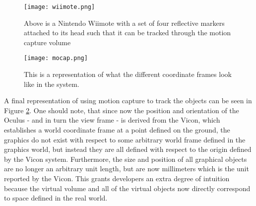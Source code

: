\begin{figure}[]
\centering
\texttt{[image: wiimote.png]}
\caption{Above is a Nintendo Wiimote with a set of four reflective markers
attached to its head such that it can be tracked through the motion capture
volume}
\label{fig:wiimote}
\end{figure}

\begin{figure}[]
\centering
\texttt{[image: mocap.png]}
\caption{This is a representation of what the different coordinate frames
look like in the system.}
\label{fig:mocap}
\end{figure}

A final representation of using motion capture to track the objects can be seen
in Figure \ref{fig:mocap}. One should note, that since now the position and
orientation of the Oculus - and in turn the view frame - is derived from the
Vicon, which establishes a world coordinate frame at a point defined on the
ground, the graphics do not exist with respect to some arbitrary world frame
defined in the graphics world, but instead they are all defined with respect to
the origin defined by the Vicon system. Furthermore, the size and position of
all graphical objects are no longer an arbitrary unit length, but are now
millimeters which is the unit reported by the Vicon. This grants developers an
extra degree of intuition because the virtual volume and all of the virtual
objects now directly correspond to space defined in the real world.


